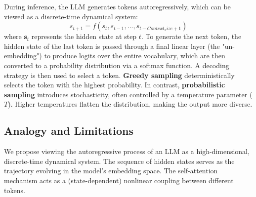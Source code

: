 \documentclass[a4paper,12pt]{article}
\begin{document}
During inference, the LLM generates tokens autoregressively, which can be viewed as a discrete-time dynamical system:
\begin{equation}
     s_{t+1} = f(s_t, s_{t-1}, ..., s_{t-Context_size+1})
\end{equation}
where $\mathbf{s}_t$ represents the hidden state at step $t$. 
To generate the next token, the hidden state of the last token is passed through a final linear layer (the "un-embedding") to produce logits over the entire vocabulary, which are then converted to a probability distribution via a softmax function. A decoding strategy is then used to select a token. \textbf{Greedy sampling} deterministically selects the token with the highest probability. In contrast, \textbf{probabilistic sampling} introduces stochasticity, often controlled by a temperature parameter ($T$). Higher temperatures flatten the distribution, making the output more diverse.



\subsection{Analogy and Limitations}
\label{subsec:analogy_limitations}
We propose viewing the autoregressive process of an LLM as a high-dimensional, discrete-time dynamical system. The sequence of hidden states serves as the trajectory evolving in the model's embedding space. The self-attention mechanism acts as a (state-dependent) nonlinear coupling between different tokens. 
\end{document}
